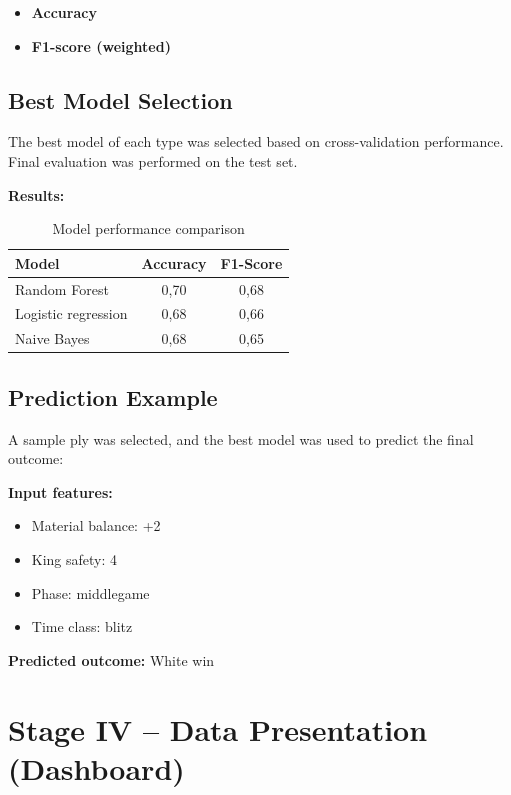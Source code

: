 \documentclass[12pt,a4paper]{article}
\begin{document}
\begin{itemize}
    \item \textbf{Accuracy}
    \item \textbf{F1-score (weighted)}
\end{itemize}

\subsection{Best Model Selection}

The best model of each type was selected based on cross-validation performance. Final evaluation was performed on the test set.

\textbf{Results:}

\begin{table}[H]
\centering
\begin{tabular}{lcc}
\toprule
Model & Accuracy & F1-Score \\
\midrule
Random Forest & 0,70 & 0,68 \\
Logistic regression & 0,68 & 0,66 \\
Naive Bayes & 0,68 & 0,65 \\
\bottomrule
\end{tabular}
\caption{Model performance comparison}
\end{table}

\subsection{Prediction Example}

A sample ply was selected, and the best model was used to predict the final outcome:

\textbf{Input features:}

\begin{itemize}
    \item Material balance: +2
    \item King safety: 4
    \item Phase: middlegame
    \item Time class: blitz
\end{itemize}

\textbf{Predicted outcome:} White win

\section{Stage IV -- Data Presentation (Dashboard)}
\end{document}
